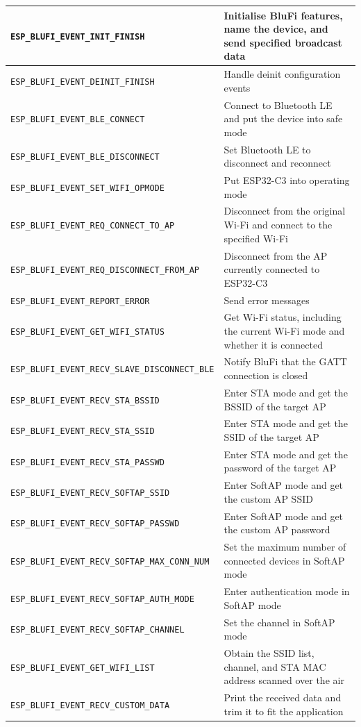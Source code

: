 \documentclass[a4paper,12pt,openany]{book}
\begin{document}
\begin{itemize}[leftmargin=1.5em]
{\begin{longtable}{|>{\scriptsize}m{}|>{\footnotesize}m{}|}
    \verb|ESP_BLUFI_EVENT_INIT_FINISH|&Initialise BluFi features, name the device, and send specified broadcast data\\
    \hline
    \verb|ESP_BLUFI_EVENT_DEINIT_FINISH|&Handle deinit configuration events\\
    \hline
    \verb|ESP_BLUFI_EVENT_BLE_CONNECT|&Connect to Bluetooth LE and put the device into safe mode\\
    \hline
    \verb|ESP_BLUFI_EVENT_BLE_DISCONNECT|&Set Bluetooth LE to disconnect and reconnect\\
    \hline
    \verb|ESP_BLUFI_EVENT_SET_WIFI_OPMODE|&Put ESP32-C3 into operating mode\\
    \hline
    \verb|ESP_BLUFI_EVENT_REQ_CONNECT_TO_AP|&Disconnect from the original Wi-Fi and connect to the specified Wi-Fi\\
    \hline
    \verb|ESP_BLUFI_EVENT_REQ_DISCONNECT_FROM_AP|&Disconnect from the AP currently connected to ESP32-C3\\
    \hline
    \verb|ESP_BLUFI_EVENT_REPORT_ERROR|&Send error messages\\
    \hline
    \verb|ESP_BLUFI_EVENT_GET_WIFI_STATUS|&Get Wi-Fi status, including the current Wi-Fi mode and whether it is connected\\
    \hline
    \verb|ESP_BLUFI_EVENT_RECV_SLAVE_DISCONNECT_BLE|&Notify BluFi that the GATT connection is closed\\
    \hline
    \verb|ESP_BLUFI_EVENT_RECV_STA_BSSID|&Enter STA mode and get the BSSID of the target AP\\
    \hline
    \verb|ESP_BLUFI_EVENT_RECV_STA_SSID|&Enter STA mode and get the SSID of the target AP\\
    \hline
    \verb|ESP_BLUFI_EVENT_RECV_STA_PASSWD|&Enter STA mode and get the password of the target AP\\
    \hline
    \verb|ESP_BLUFI_EVENT_RECV_SOFTAP_SSID|&Enter SoftAP mode and get the custom AP SSID\\
    \hline
    \verb|ESP_BLUFI_EVENT_RECV_SOFTAP_PASSWD|&Enter SoftAP mode and get the custom AP password\\
    \hline
    \verb|ESP_BLUFI_EVENT_RECV_SOFTAP_MAX_CONN_NUM|&Set the maximum number of connected devices in SoftAP mode\\
    \hline
    \verb|ESP_BLUFI_EVENT_RECV_SOFTAP_AUTH_MODE|&Enter authentication mode in SoftAP mode\\
    \hline
    \verb|ESP_BLUFI_EVENT_RECV_SOFTAP_CHANNEL|&Set the channel in SoftAP mode\\
    \hline
    \verb|ESP_BLUFI_EVENT_GET_WIFI_LIST|&Obtain the SSID list, channel, and STA MAC address scanned over the air\\
    \hline
    \verb|ESP_BLUFI_EVENT_RECV_CUSTOM_DATA|&Print the received data and trim it to fit the application\\
    \hline
\end{longtable}
}


\end{itemize}
\end{document}

